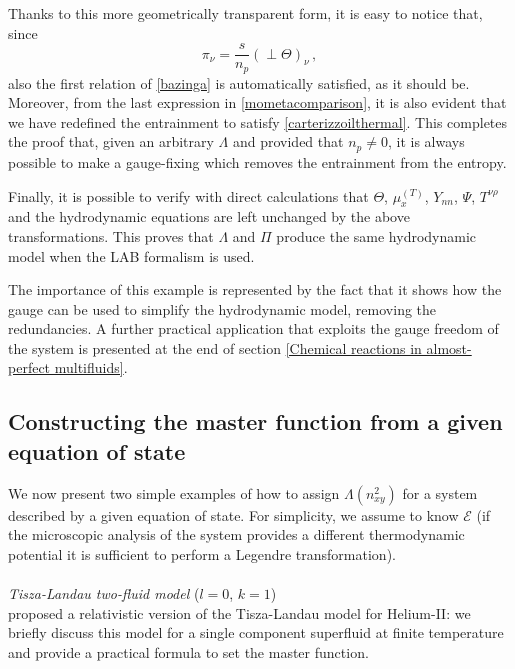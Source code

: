 \documentclass[usenatbib]{mnras}
\begin{document}
%
Thanks to this more geometrically transparent form, it is easy to notice that, since
%
\begin{equation}
\pi_\nu = \dfrac{s}{n_p} ({\perp}\Theta)_\nu \, ,
\end{equation}
%
also the first relation of \eqref{bazinga} is automatically satisfied, as it should be. Moreover, from the last expression in \eqref{mometacomparison}, it is also evident that we have redefined the entrainment to satisfy \eqref{carterizzoilthermal}. This completes the proof that, given an arbitrary $\Lambda$ and provided that $n_p \neq 0$, it is always possible to make a gauge-fixing which removes the entrainment from the entropy. 

Finally, it is possible to verify with direct calculations that $\Theta$, $\mu_x^{(T)}$, $Y_{nn}$, $\Psi$, $T^{\nu \rho}$ and the hydrodynamic equations are left unchanged by the above transformations. This proves that $\Lambda$ and $\Pi$ produce the same  hydrodynamic model when the LAB formalism is used.

The importance of this example is represented by the fact that it shows how the gauge can be used to simplify the hydrodynamic model, removing the redundancies. A further practical application that exploits the  gauge freedom of the system is presented at the end of section \ref{Chemical reactions in almost-perfect multifluids}.


\subsection{Constructing the master function from a given equation of state}
\label{costruireLambda}

We now present two simple examples of how to assign $\Lambda(n_{xy}^2)$ for a system described by a given equation of state. For simplicity, we assume to know $\mathcal{E}$ (if the microscopic analysis of the system provides a different thermodynamic potential it is sufficient to perform a Legendre transformation). 
\\
\\
\emph{Tisza-Landau two-fluid model} ($l=0$, $k=1$) 
\\
\cite{cool1995} proposed a relativistic version of the Tisza-Landau model for Helium-II: we briefly discuss this model for a single component superfluid at finite temperature and provide a practical formula to set the master function.  
\end{document}
